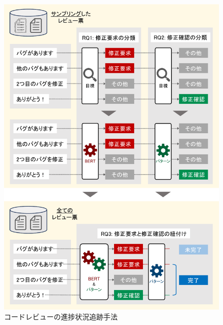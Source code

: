 \documentclass[11pt]{jreport}
\newcommand{\todo}[1]{\colorbox{yellow}{{\bf TODO}:}{\color{red} {\textbf{[#1]}}}}
\begin{document}


\begin{figure}[t]
\centerline{\includegraphics[width=1.0\linewidth]{@BSthesis2024_Kawasaki/BSthesis2024_Kawasaki_fig/research_method.pdf}}
\caption{コードレビューの進捗状況追跡手法}
\label{fig:research_method}
\end{figure}
\end{document}

